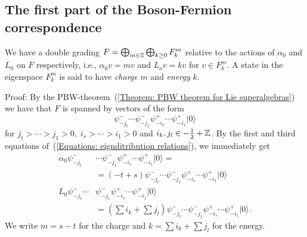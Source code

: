 \subsection{The first part of the Boson-Fermion correspondence}
\begin{dang}
    \begin{theorem}\cite{kac2013bombay}
        We have a double grading $F=\bigoplus_{m\in\mathbb{Z}}\bigoplus_{k\geq0}F_k^m$ relative to the actions of $\alpha_0$ and $L_0$ on $F$ respectively, i.e., $\alpha_0v=mv$ and $L_ov=kv$ for $v\in F_k^m$. A state in the eigenspace $F_k^m$ is said to have \textit{charge} $m$ and \textit{energy} $k$.
    \end{theorem}
\end{dang}
Proof: By the PBW-theorem~(\ref{Theorem: PBW theorem for Lie superalgebras}) we have that $F$ is spanned by vectors of the form
\begin{equation}\label{Equation: generic monomial of F}
    \psi_{-j_t}^-\cdots\psi_{-j_1}^- \psi_{-i_s}^+\cdots\psi_{-i_1}^+|0\rangle
\end{equation}
for $j_t>\cdots>j_1>0,\;i_s>\cdots>i_1>0$ and $i_k,j_l \in -\frac{1}{2}+\mathbb{Z}$. By the first and third equations of~(\ref{Equations: eignditribution relations}), we immediately get
\begin{equation}
\begin{split}
      \alpha_0\psi_{-j_t}^-&\cdots\psi_{-j_1}^- \psi_{-i_s}^+\cdots\psi_{-i_1}^+|0\rangle=\\
      &=(-t+s)\psi_{-j_t}^-\cdots\psi_{-j_1}^- \psi_{-i_s}^+\cdots\psi_{-i_1}^+|0\rangle\\
        L_0\psi_{-j_t}^-\cdots&\psi_{-j_1}^- \psi_{-i_s}^+\cdots\psi_{-i_1}^+|0\rangle\\&=\left(\sum i_k+\sum j_l\right)\psi_{-j_t}^-\cdots\psi_{-j_1}^- \psi_{-i_s}^+\cdots\psi_{-i_1}^+|0\rangle.
\end{split}
\end{equation}
We write $m=s-t$ for the charge and $k=\sum i_k+\sum j_l$ for the energy.\par

